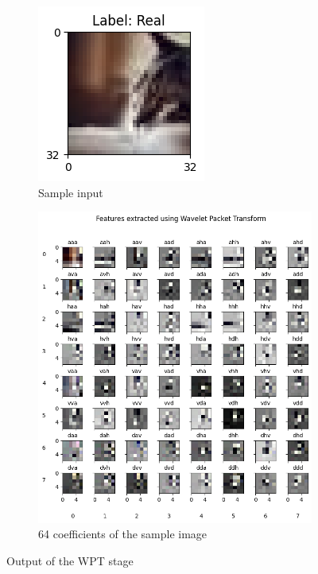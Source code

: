 \documentclass{svproc}
\begin{document}
\begin{figure}[H]
  \centering
  \begin{subfigure}{0.25\textwidth}
    \centering
    \includegraphics[width=0.9\linewidth]{figures/exp1_img.png}
    \caption{Sample input}
    \label{fig:exp1_sub1}
  \end{subfigure}%

  \bigskip
  
  \begin{subfigure}{0.7\textwidth}
    \centering
    \includegraphics[width=0.9\linewidth]{figures/exp1_img_wptdec.png}
    \caption{64 coefficients of the sample image}
    \label{fig:exp1_sub2}
  \end{subfigure}

  \caption{Output of the WPT stage}
  \label{fig:db2_dec_exp1}
\end{figure}
\end{document}
